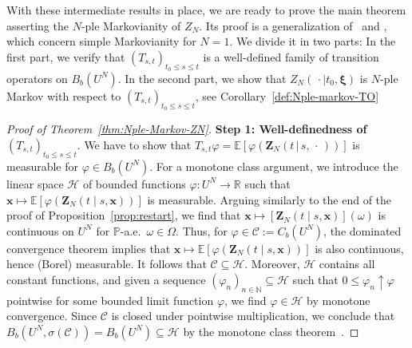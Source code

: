 \documentclass[reqno]{amsart}
\numberwithin{equation}{section}
\newcommand{\bbP}{\mathbb{P}}
\newcommand{\bbR}{\mathbb{R}}
\newcommand{\N}{\mathbb{N}}
\newcommand{\E}{\mathbb{E}}
\newcommand{\from}{\colon}
\theoremstyle{remark}
\theoremstyle{definition}
\begin{document}
With these intermediate results in place, we are ready to prove the main 
theorem asserting the $N$-ple Markovianity 
of $Z_N$.
Its proof is a generalization of~\cite[Theorem~9.14]{DaPrato2014} and \cite[Theorem~9.30]{PeszatZabczyk2007},
which concern simple Markovianity for $N = 1$.
We divide it in two parts: In the first part, we verify that
$(T_{s,t})_{t_0 \le s \le t}$ is a well-defined family of transition operators on $B_b(U^N)$.
In the second part, we show that $Z_N(\,\cdot\mid t_0, \bm\xi)$ is $N$-ple Markov with respect to
$(T_{s,t})_{t_0 \le s \le t}$, see Corollary~\ref{def:Nple-markov-TO}
%
\begin{proof}[Proof of Theorem~\ref{thm:Nple-Markov-ZN}]
	\textbf{Step 1: Well-definedness of $(T_{s,t})_{t_0 \le s \le t}$}.
	We have to
	show that $T_{s, t}\varphi = \E[\varphi(\mathbf Z_N(t \, | \, s, \,\cdot\,))]$ is measurable 
	for $\varphi \in B_b(U^N)$.
	For a monotone class argument,
	we introduce the linear space $\mathscr H$ of bounded functions
	$\varphi \from U^N \to \bbR$ such that $\mathbf x \mapsto \E[\varphi(\mathbf Z_N(t\mid s, \mathbf x))]$ is measurable.
	Arguing similarly to the end of the proof of Proposition~\ref{prop:restart}, we find that 
	${\mathbf x \mapsto [\mathbf Z_N(t\mid s, \mathbf x)](\omega)}$
	is continuous on $U^N$ for $\bbP$-a.e.\ $\omega \in \Omega$.
	Thus, for $\varphi \in \mathscr C := C_b(U^N)$, the dominated convergence theorem implies that
	$\mathbf x \mapsto \E[\varphi(\mathbf Z_N(t\mid s, \mathbf x))]$
	is also continuous, hence (Borel) measurable.
	It follows that $\mathscr C \subseteq \mathscr H$.
	Moreover, $\mathscr H$ contains all constant functions, and given a
	sequence
	$(\varphi_n)_{n\in\N} \subseteq \mathscr H$ such that ${0 \le \varphi_n \uparrow \varphi}$ pointwise 
	for some bounded limit function
	$\varphi$, we find $\varphi \in \mathscr H$ by monotone convergence.
	Since $\mathscr C$ is closed under pointwise multiplication,
	we conclude that 
	$B_b(U^N\!, \sigma(\mathscr C)) = B_b(U^N) \subseteq \mathscr H$ by the monotone class
	theorem~\cite[Chapter~0, Theorem~2.2]{RevuzYor1999}.
	

\end{proof}
\end{document}

